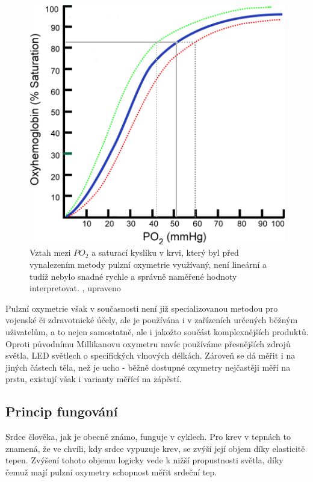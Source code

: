 \begin{figure}[H]
  \includegraphics[scale=1, center]{Kapitoly/Teoreticka/Obrazky/TlakKysliku.png}
  \caption [Vztah mezi $PO_2$ a saturací kyslíku v krvi]{Vztah mezi $PO_2$ a saturací kyslíku v krvi, který byl před vynalezením metody pulzní oxymetrie využívaný, není lineární a tudíž nebylo snadné rychle a správně naměřené hodnoty interpretovat. \citep{ratznium_2006}, upraveno}
  \label{fig:PO2}
\end{figure}
\par Pulzní oxymetrie však v současnosti není již specializovanou metodou pro vojenské či zdravotnické účely, ale je používána i v zařízeních určených běžným uživatelům, a to nejen samostatně, ale i jakožto součást komplexnějších produktů. Oproti původnímu Millikanovu oxymetru navíc používáme přesnějších zdrojů světla, LED světlech o specifických vlnových délkách. Zároveň se dá měřit i na jiných částech těla, než je ucho - běžně dostupné oxymetry nejčastěji měří na prstu, existují však i varianty měřící na zápěstí.
\subsection {Princip fungování}
Srdce člověka, jak je obecně známo, funguje v cyklech. Pro krev v tepnách to znamená, že ve chvíli, kdy srdce vypuzuje krev, se zvýší její objem díky elasticitě tepen. Zvýšení tohoto objemu logicky vede k nižší propustnosti světla, díky čemuž mají pulzní oxymetry schopnost měřit srdeční tep.
